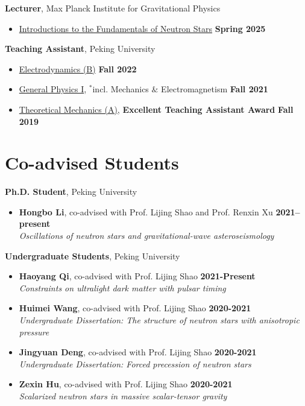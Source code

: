 \documentclass[margin,line]{res}
\begin{document}
\begin{resume}
{\bf Lecturer}, Max Planck Institute for Gravitational Physics 
\vspace*{.05in}
\begin{itemize}
  \item[ ] \href{https://springschool.aei.mpg.de/}{Introductions to the Fundamentals of Neutron Stars} \hfill {\bf Spring 2025}
\end{itemize}


{\bf Teaching Assistant}, Peking University
\vspace*{.05in}
\begin{itemize}
  \item[ ] \href{http://friendshao.github.io/teaching/ced22/}{Electrodynamics (B)} \hfill {\bf Fall 2022}
\item[ ] \href{http://friendshao.github.io/teaching/phy21/}{General Physics I}, $^{*}${\small incl. Mechanics $\&$ Electromagnetism} \hfill {\bf Fall 2021}
\item[ ] \href{http://friendshao.github.io/teaching/thmech19/}{Theoretical Mechanics (A)}, {\small{\bf Excellent Teaching Assistant Award}} \hfill {\bf Fall 2019}
\end{itemize}

\section{\sc Co-advised Students}

{\bf Ph.D. Student}, Peking University
\vspace*{.05in}
\begin{itemize}
\item[] {\bf Hongbo Li}, co-advised with Prof. Lijing Shao and Prof. Renxin Xu 
\hfill {\bf 2021--present} \\
\vspace*{.05in}
{\it  Oscillations of neutron stars and gravitational-wave asteroseismology}
\end{itemize}
{\bf Undergraduate Students}, Peking University
\vspace*{.05in}
\begin{itemize}
\item[] {\bf Haoyang Qi}, co-advised with Prof. Lijing Shao
\hfill {\bf 2021-Present}\\
{\it Constraints on ultralight dark matter with pulsar timing}
\item[] {\bf Huimei Wang}, co-advised with Prof. Lijing Shao 
\hfill {\bf 2020-2021}\\
{\it Undergraduate Dissertation: The structure of neutron stars with anisotropic pressure}
\item[] {\bf Jingyuan Deng}, co-advised with Prof. Lijing Shao 
\hfill {\bf 2020-2021}\\
{\it Undergraduate Dissertation: Forced precession of neutron stars}
\item[] {\bf Zexin Hu}, co-advised with Prof. Lijing Shao
\hfill {\bf 2020-2021}\\
{\it Scalarized neutron stars in massive scalar-tensor gravity}
\end{itemize}


\end{resume}
\end{document}
